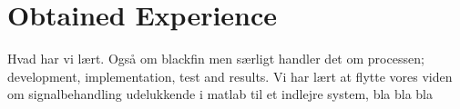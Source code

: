 \chapter{Obtained Experience}
Hvad har vi lært. Også om blackfin men særligt handler det om processen; development, implementation, test and results. Vi har lært at flytte vores viden om signalbehandling udelukkende i matlab til et indlejre system, bla bla bla